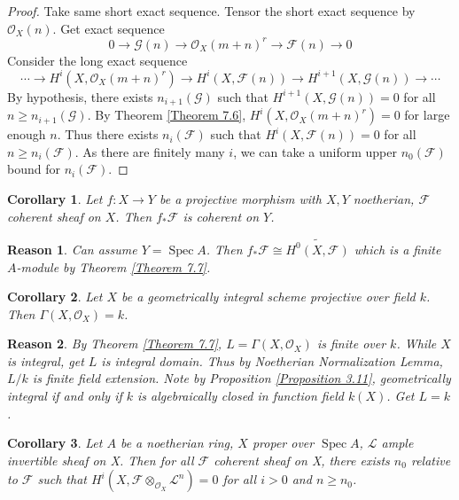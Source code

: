 \documentclass{ctexart}
\newtheorem{reason}{Reason}[section]
\newtheorem{corollary}{Corollary}[section]
\newcommand{\spec}{\operatorname{Spec}}
\begin{document}
\begin{proof}
    Take same short exact sequence.
    Tensor the short exact sequence by $\mathcal{O}_{X}(n)$.
    Get exact sequence
    \begin{equation*}
        0 \longrightarrow \mathcal{G}(n) \longrightarrow \mathcal{O}_{X}(m + n)^{r} \longrightarrow \mathcal{F}(n) \longrightarrow 0
    \end{equation*}
    Consider the long exact sequence
    \begin{equation*}
        \cdots \longrightarrow H^{i}(X, \mathcal{O}_{X}(m + n)^{r}) \longrightarrow H^{i}(X, \mathcal{F}(n)) \longrightarrow H^{i + 1}(X, \mathcal{G}(n)) \longrightarrow \cdots
    \end{equation*}
    By hypothesis, there exists $n_{i + 1}(\mathcal{G})$ such that $H^{i + 1}(X, \mathcal{G}(n)) = 0$ for all $n \ge n_{i + 1}(\mathcal{G})$.
    By Theorem \ref{Theorem 7.6}, $H^{i}(X, \mathcal{O}_{X}(m + n)^{r}) = 0$ for large enough $n$.
    Thus there exists $n_{i}(\mathcal{F})$ such that $H^{i}(X, \mathcal{F}(n)) = 0$ for all $n \ge n_{i}(\mathcal{F})$.
    As there are finitely many $i$, we can take a uniform upper $n_{0}(\mathcal{F})$ bound for $n_{i}(\mathcal{F})$.
\end{proof}
\begin{corollary}
    Let $f: X \longrightarrow Y$ be a projective morphism with $X, Y$ noetherian, $\mathcal{F}$ coherent sheaf on $X$.
    Then $f_{\ast}\mathcal{F}$ is coherent on $Y$.
    \label{Corollary 7.8}
\end{corollary}
\begin{reason}
    Can assume $Y = \spec A$.
    Then $f_{\ast}\mathcal{F} \cong \widetilde{H^{0}(X, \mathcal{F})}$ which is a finite $A$-module by Theorem \ref{Theorem 7.7}.
\end{reason}
\begin{corollary}
    Let $X$ be a geometrically integral scheme projective over field $k$.
    Then $\Gamma(X, \mathcal{O}_{X}) = k$.
    \label{Corollary 7.9} 
\end{corollary}
\begin{reason}
    By Theorem \ref{Theorem 7.7}, $L = \Gamma(X, \mathcal{O}_{X})$ is finite over $k$.
    While $X$ is integral, get $L$ is integral domain.
    Thus by Noetherian Normalization Lemma, $L/k$ is finite field extension.
    Note by Proposition \ref{Proposition 3.11}, geometrically integral if and only if $k$ is algebraically closed in function field $k(X)$.
    Get $L = k$.
\end{reason}
\begin{corollary}
    Let $A$ be a noetherian ring, $X$ proper over $\spec A$, $\mathcal{L}$ ample invertible sheaf on X.
    Then for all $\mathcal{F}$ coherent sheaf on X, there exists $n_{0}$ relative to $\mathcal{F}$ such that $H^{i}(X, \mathcal{F} \otimes_{\mathcal{O}_{X}} \mathcal{L}^{n}) = 0$ for all $i > 0$ and $n \ge n_{0}$. 
    \label{Corollary 7.10}
\end{corollary}
\end{document}
